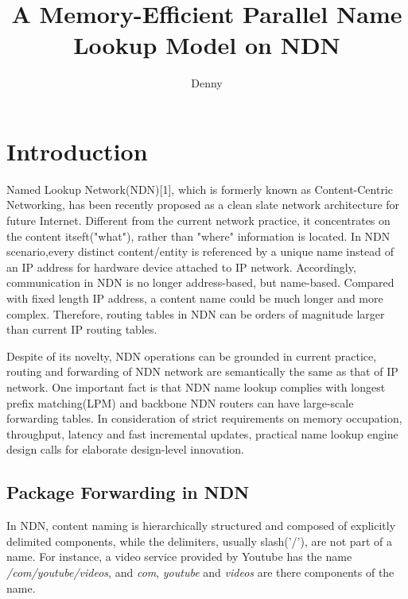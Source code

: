 \documentclass[twocolumn]{article}
\begin{document}
\title{A Memory-Efficient Parallel Name Lookup Model on NDN}
\author{Denny}
\date{}
\maketitle
\begin{abstract}
\end{abstract}

\section{Introduction}
Named Lookup Network(NDN)[1], which is formerly known as Content-Centric Networking, has been recently proposed as a clean slate network architecture for future Internet. Different from the current network practice, it concentrates on the content itseft("what"), rather than "where" information is located. In NDN scenario,every distinct content/entity is referenced by a  unique name instead of an IP address for hardware device attached to IP network. Accordingly, communication in NDN is no longer address-based, but name-based. Compared with fixed length IP address, a content name could be much longer and more complex. Therefore, routing tables in NDN can be orders of magnitude larger than current IP routing tables.

Despite of its novelty, NDN operations can be grounded in current practice, routing and forwarding  of NDN network are semantically the same as that of IP network. One important fact is that NDN name lookup complies with longest prefix matching(LPM) and backbone NDN routers can have large-scale forwarding tables. In consideration of strict requirements on memory occupation, throughput, latency and fast incremental updates, practical name lookup engine design calls for elaborate design-level innovation.

\subsection{Package Forwarding in NDN}
In NDN, content naming is hierarchically structured and composed of explicitly delimited components, while the delimiters, usually slash('/'), are not part of a name. For instance, a video service provided by Youtube has the name \textit{/com/youtube/videos}, and \textit{com}, \textit{youtube} and \textit{videos} are there components of  the name.

\end{document}
